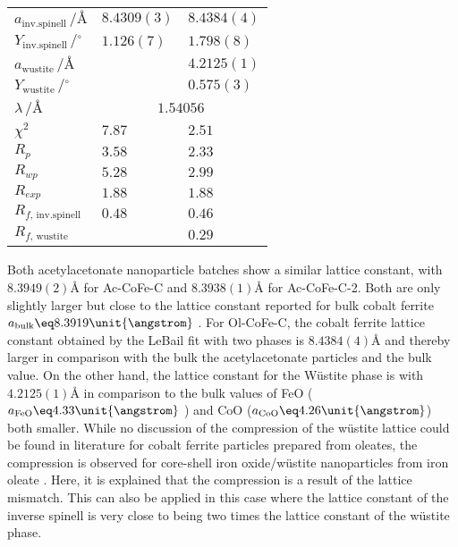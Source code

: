 \documentclass[\main/dresen_thesis.tex]{subfiles}
\begin{document}
\begin{table}[ht]
\begin{tabular}{ l | l | l }
      \rule{0pt}{2ex} $a_\mathrm{inv. spinell} \,/ \unit{\angstrom}$         & $8.4309(3)$ & $8.4384(4)$  \\
      \rule{0pt}{2ex} $Y_\mathrm{inv. spinell} \,/ \unit{^\circ}$            & $1.126(7)$  & $1.798(8)$   \\
      \rule{0pt}{2ex} $a_\mathrm{wustite}     \,/ \unit{\angstrom}$ &             & $4.2125(1)$  \\
      \rule{0pt}{2ex} $Y_\mathrm{wustite}     \,/ \unit{^\circ}$    &             & $0.575(3)$   \\
      \hline
      \rule{0pt}{2ex} $\lambda \,/ \unit{\angstrom}$  & \multicolumn{2}{c}{$1.54056$}\\
      \hline
      \rule{0pt}{2ex} $\chi^2$                   & $7.87$ & $2.51$ \\
      \rule{0pt}{2ex} $R_p$                      & $3.58$ & $2.33$ \\
      \rule{0pt}{2ex} $R_{wp}$                   & $5.28$ & $2.99$ \\
      \rule{0pt}{2ex} $R_{exp}$                  & $1.88$ & $1.88$ \\
      \rule{0pt}{2ex} $R_{f, \, \mathrm{inv. spinell}}$   & $0.48$ & $0.46$ \\
      \rule{0pt}{2ex} $R_{f, \, \mathrm{wustite}}$       &        & $0.29$ \\
      \hline
    \end{tabular}
  \end{table}

    Both acetylacetonate nanoparticle batches show a similar lattice constant, with $8.3949(2) \unit{\angstrom}$ for Ac-CoFe-C and $8.3938(1) \unit{\angstrom}$ for Ac-CoFe-C-2.
    Both are only slightly larger but close to the lattice constant reported for bulk cobalt ferrite $a_\mathrm{bulk} \eq 8.3919 \unit{\angstrom}$ \cite{Stein_2018_Struct}.
    For Ol-CoFe-C, the cobalt ferrite lattice constant obtained by the LeBail fit with two phases is $8.4384(4) \unit{\angstrom}$ and thereby larger in comparison with the bulk the acetylacetonate particles and the bulk value.
    On the other hand, the lattice constant for the W\"ustite phase is with $4.2125(1) \unit{\angstrom}$ in comparison to the bulk values of FeO ($a_\mathrm{FeO} \eq 4.33 \unit{\angstrom}$ \cite{Hentschel_1970_Stoich}) and CoO ($a_\mathrm{CoO} \eq 4.26 \unit{\angstrom}$) both smaller.
    While no discussion of the compression of the w\"ustite lattice could be found in literature for cobalt ferrite particles prepared from oleates, the compression is observed for core-shell iron oxide/w\"ustite nanoparticles from iron oleate  \cite{Wetterskog_2013_Anoma}.
    Here, it is explained that the compression is a result of the lattice mismatch.
    This can also be applied in this case where the lattice constant of the inverse spinell is very close to being two times the lattice constant of the w\"ustite phase.
\end{document}
